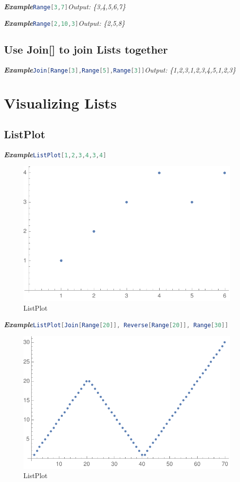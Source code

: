 \documentclass[10pt]{book}
\newcommand{\iocode}[2]{\lstinline[language=Mathematica]|#1|\hspace{\fill}\emph{Output: #2}}
\newcommand{\egio}[2]{\noindent\emph{\textbf{Example}}\quad\iocode{#1}{#2}}
\begin{document}
\egio{Range[3,7]}{\{3,4,5,6,7\}}

\egio{Range[2,10,3]}{\{2,5,8\}}


\subsection{Use Join[] to join Lists together}
\egio{Join[Range[3],Range[5],Range[3]]}{\{1,2,3,1,2,3,4,5,1,2,3\}}
\section{Visualizing Lists}

\subsection{ListPlot}

\emph{\textbf{Example}}\quad\lstinline[language=Mathematica]|ListPlot[1,2,3,4,3,4]|
\begin{figure}[H]
  \centering
  \includegraphics[width=0.45\linewidth]{figures/ListPlot}
  \caption{ListPlot}
\end{figure}



\noindent\emph{\textbf{Example}}\quad\lstinline[language=Mathematica]|ListPlot[Join[Range[20]], Reverse[Range[20]], Range[30]]|

\begin{figure}[H]
  \centering
  \includegraphics[width=0.45\linewidth]{figures/ListPlot2}
  \caption{ListPlot}
\end{figure}
\end{document}
